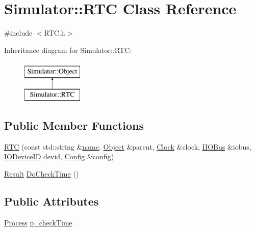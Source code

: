 \hypertarget{class_simulator_1_1_r_t_c}{\section{Simulator\+:\+:R\+T\+C Class Reference}
\label{class_simulator_1_1_r_t_c}
}


{\ttfamily \#include $<$R\+T\+C.\+h$>$}

Inheritance diagram for Simulator\+:\+:R\+T\+C\+:\begin{figure}[H]
\begin{center}
\leavevmode
\includegraphics[height=2.000000cm]{class_simulator_1_1_r_t_c}
\end{center}
\end{figure}
\subsection*{Public Member Functions}
\begin{DoxyCompactItemize}
\item 
\hyperlink{class_simulator_1_1_r_t_c_a50ea4e1bd240c9dabe660f9b36951ca5}{R\+T\+C} (const std\+::string \&\hyperlink{mtconf_8c_a8f8f80d37794cde9472343e4487ba3eb}{name}, \hyperlink{class_simulator_1_1_object}{Object} \&parent, \hyperlink{class_simulator_1_1_clock}{Clock} \&clock, \hyperlink{class_simulator_1_1_i_i_o_bus}{I\+I\+O\+Bus} \&iobus, \hyperlink{namespace_simulator_a3493d987c866ad6b8aaa704c42502db0}{I\+O\+Device\+I\+D} devid, \hyperlink{class_config}{Config} \&config)
\item 
\hyperlink{namespace_simulator_a4b6b5616e7236c0c131516a441776805}{Result} \hyperlink{class_simulator_1_1_r_t_c_a99861ca316a5837c73c48ef25469cae6}{Do\+Check\+Time} ()
\end{DoxyCompactItemize}
\subsection*{Public Attributes}
\begin{DoxyCompactItemize}
\item 
\hyperlink{class_simulator_1_1_process}{Process} \hyperlink{class_simulator_1_1_r_t_c_a2b4414816760ec2e6a2d1a0af89861c8}{p\+\_\+check\+Time}
\end{DoxyCompactItemize}
